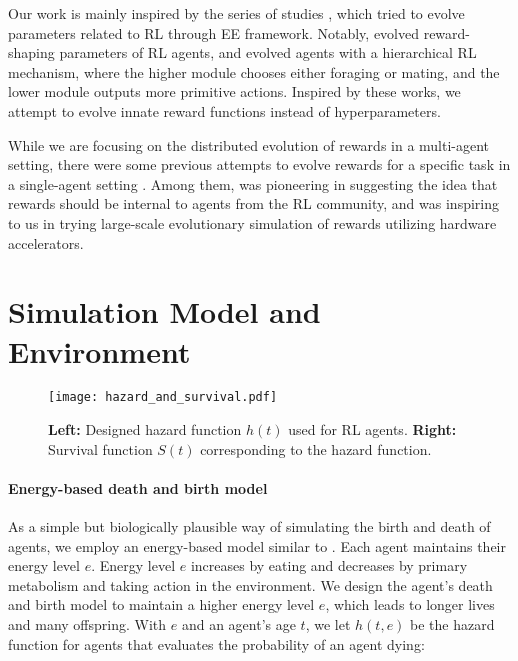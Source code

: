 Our work is mainly inspired by the series of studies \citep{elfwingBiologicallyInspiredEmbodied2005,elfwingDarwinianEmbodiedEvolution2011,elfwingEmergencePolymorphicMating2014}, which tried to evolve parameters related to RL through EE framework. Notably, \citet{elfwingDarwinianEmbodiedEvolution2011} evolved reward-shaping parameters of RL agents, and \citet{elfwingEmergencePolymorphicMating2014} evolved agents with a hierarchical RL mechanism, where the higher module chooses either foraging or mating, and the lower module outputs more primitive actions. Inspired by these works, we attempt to evolve innate reward functions instead of hyperparameters.

While we are focusing on the distributed evolution of rewards in a multi-agent setting, there were some previous attempts to evolve rewards for a specific task in a single-agent setting \citep{singhWhereRewardsCome2009,niekumEvolutionRewardFunctions2011,zhengWhatCanLearned2020}. Among them, \citet{singhWhereRewardsCome2009} was pioneering in suggesting the idea that rewards should be internal to agents from the RL community, and \citet{zhengWhatCanLearned2020} was inspiring to us in trying large-scale evolutionary simulation of rewards utilizing hardware accelerators.

\section{Simulation Model and Environment}\label{sec:method}

\begin{figure}[t]
  \centering{}
  \texttt{[image: hazard\_and\_survival.pdf]}
  \caption{
    \textbf{Left:} Designed hazard function $h(t)$ used for RL agents.
    \textbf{Right:} Survival function $S(t)$ corresponding to the hazard function.
  }\label{figure:hs}
\end{figure}

\paragraph{Energy-based death and birth model}
As a simple but biologically plausible way of simulating the birth and death of agents, we employ an energy-based model similar to \citet{hamonEcoevolutionaryDynamicsNonepisodic2023}. Each agent maintains their energy level $e$. Energy level $e$ increases by eating and decreases by primary metabolism and taking action in the environment. We design the agent's death and birth model to maintain a higher energy level $e$, which leads to longer lives and many offspring. With $e$ and an agent's age $t$, we let $h(t, e)$ be the hazard function for agents that evaluates the probability of an agent dying:

